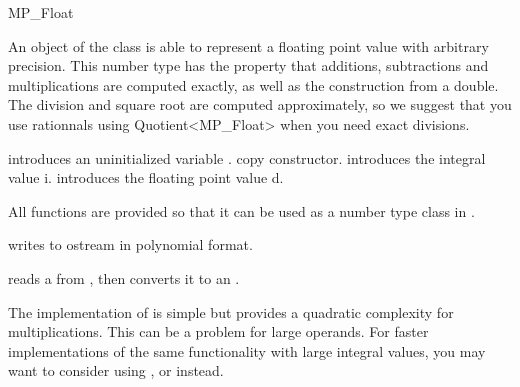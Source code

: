 
\begin{ccClass} {MP_Float}
\label{mpfloat}

\ccDefinition
An object of the class  is able to represent a floating point
value with arbitrary precision.  This number type has the property that
additions, subtractions and multiplications are computed exactly, as well as
the construction from a double.  The division and square root are computed
approximately, so we suggest that you use rationnals using Quotient<MP\_Float>
when you need exact divisions.


\ccCreation
{}

{introduces an uninitialized variable \ccVar.}
\ccGlue
{}
{copy constructor.}
\ccGlue
{}
{introduces the integral value i.}
\ccGlue
{}
{introduces the floating point value d.}

\ccOperations
All functions are provided so that it can be used as a number type class in
\cgal.

{writes  to ostream  in polynomial format.}

{reads a  from , then converts it to an .}

\end{ccClass} 

\ccImplementation 
The implementation of  is simple but provides a quadratic
complexity for multiplications.  This can be a problem for large operands.
For faster implementations of the same functionality with large integral
values, you may want to consider using ,  or 
instead.

